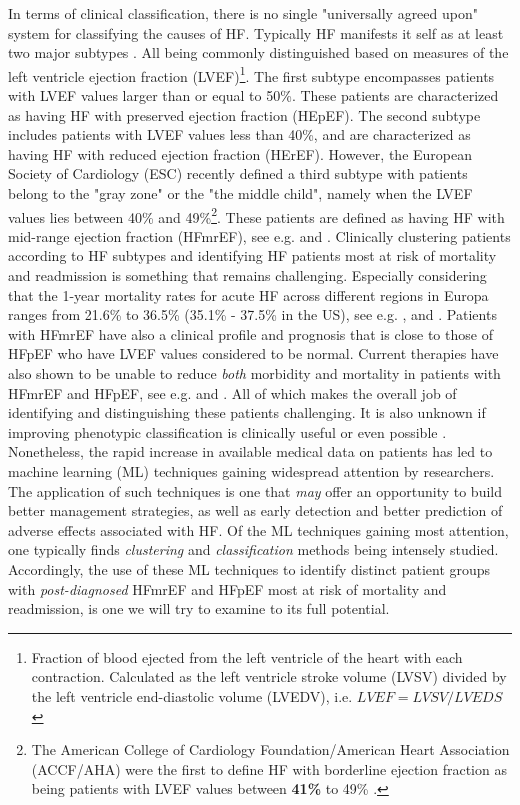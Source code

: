 \documentclass[../thesis.tex]{subfiles}
\begin{document}
\indent In terms of clinical classification, there is no single "universally agreed upon" system for classifying the causes of HF. Typically HF manifests it self as at least two major subtypes \citep{alonso2015exploring}. All being commonly distinguished based on measures of the left ventricle ejection fraction (LVEF)\footnote{Fraction of blood ejected from the left ventricle of the heart with each contraction. Calculated as the left ventricle stroke volume (LVSV) divided by the left ventricle end-diastolic volume (LVEDV), i.e. $LVEF = LVSV / LVEDS$ \citep{cikes2015beyond}}. The first subtype encompasses patients with LVEF values larger than or equal to 50\%. These patients are characterized as having HF with preserved ejection fraction (HEpEF). The second subtype includes patients with LVEF values less than 40\%, and are characterized as having HF with reduced ejection fraction (HErEF). However, the European Society of Cardiology (ESC) recently defined a third subtype with patients belong to the "gray zone" or the "the middle child", namely when the LVEF values lies between 40\% and 49\%\footnote{The American College of Cardiology Foundation/American Heart Association (ACCF/AHA) were the first to define HF with borderline ejection fraction as being patients with LVEF values between \textbf{41\%} to 49\% \citep{yancy2013}.}. These patients are defined as having HF with mid-range ejection fraction (HFmrEF), see e.g. \cite{lam2014middle} and \cite{ponikowski2016}. Clinically clustering patients according to HF subtypes and identifying HF patients most at risk of mortality and readmission is something that remains challenging. Especially considering that the 1-year mortality rates for acute HF across different regions in Europa ranges from 21.6\% to 36.5\% (35.1\% - 37.5\% in the US), see e.g. \cite{cheng2014outcomes}, \cite{inamdar2016heart} and \cite{crespo2016european}. Patients with HFmrEF have also a clinical profile and prognosis that is close to those of HFpEF who have LVEF values considered to be normal. Current therapies have also shown to be unable to reduce \textit{both} morbidity and mortality in patients with HFmrEF and HFpEF, see e.g. \cite{ponikowski2016} and \cite{hsu2017heart}. All of which makes the overall job of identifying and distinguishing these patients challenging. It is also unknown if improving phenotypic classification is clinically useful or even possible \citep{shah2014phenomapping}.\\
\indent Nonetheless, the rapid increase in available medical data on patients has led to machine learning (ML) techniques gaining widespread attention by researchers. The application of such techniques is one that \textit{may} offer an opportunity to build better management strategies, as well as early detection and better prediction of adverse effects associated with HF. Of the ML techniques gaining most attention, one typically finds \textit{clustering} and \textit{classification} methods being intensely studied. Accordingly, the use of these ML techniques to identify distinct patient groups with \textit{post-diagnosed} HFmrEF and HFpEF most at risk of mortality and readmission, is one we will try to examine to its full potential.
\end{document}
